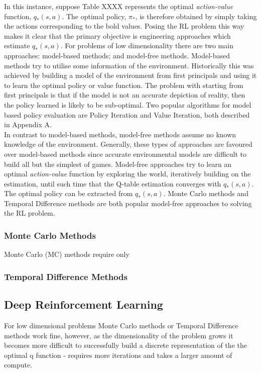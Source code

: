 \documentclass[a4paper]{article}
\begin{document}
\vspace{0.5cm}

In this instance, suppose Table XXXX represents the optimal \textit{action-value} function, $q_*(s,a)$. The optimal policy, $\pi_*$, is therefore obtained by simply taking the actions corresponding to the bold values. Posing the RL problem this way makes it clear that the primary objective is engineering approaches which estimate $q_*(s,a)$. For problems of low dimensionality there are two main approaches: model-based methods; and model-free methods. Model-based methods try to utilise some information of the environment. Historically this was achieved by building a model of the environment from first principals and using it to learn the optimal policy or value function. The problem with starting from first principals is that if the model is not an accurate depiction of reality, then the policy learned is likely to be sub-optimal. Two popular algorithms for model based policy evaluation are Policy Iteration and Value Iteration, both described in Appendix A.\\

In contrast to model-based methods, model-free methods assume no known knowledge of the environment. Generally, these types of approaches are favoured over model-based methods since accurate environmental models are difficult to build all but the simplest of games. Model-free approaches try to learn an optimal \textit{action-value} function by exploring the world, iteratively building on the estimation, until such time that the Q-table estimation converges with $q_*(s,a)$. The optimal policy can be extracted from $q_*(s,a)$. Monte Carlo methods and Temporal Difference methods are both popular model-free approaches to solving the RL problem.

\subsubsection{Monte Carlo Methods} 
Monte Carlo (MC) methods require only

\subsubsection{Temporal Difference Methods}

\subsection{Deep Reinforcement Learning}
For low dimensional problems Monte Carlo methods or Temporal Difference methods work fine, however, as the dimensionality of the problem grows it becomes more difficult to successfully build a discrete representation of the the optimal q function - requires more iterations and takes a larger amount of compute.
\end{document}
